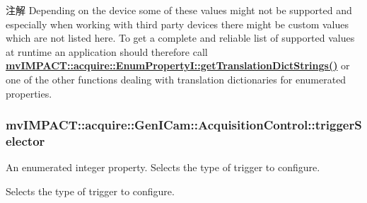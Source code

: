 \begin{DoxyNote}{注解}
Depending on the device some of these values might not be supported and especially when working with third party devices there might be custom values which are not listed here. To get a complete and reliable list of supported values at runtime an application should therefore call {\bfseries \hyperlink{classmv_i_m_p_a_c_t_1_1acquire_1_1_enum_property_i_a0ba6ccbf5ee69784d5d0b537924d26b6}{mv\+I\+M\+P\+A\+C\+T\+::acquire\+::\+Enum\+Property\+I\+::get\+Translation\+Dict\+Strings()}} or one of the other functions dealing with translation dictionaries for enumerated properties. 
\end{DoxyNote}
\hypertarget{classmv_i_m_p_a_c_t_1_1acquire_1_1_gen_i_cam_1_1_acquisition_control_a38e4b4d2d7da4b24d3686be94cc0a886}{
\subsubsection[{trigger\+Selector}]{ mv\+I\+M\+P\+A\+C\+T\+::acquire\+::\+Gen\+I\+Cam\+::\+Acquisition\+Control\+::trigger\+Selector}}\label{classmv_i_m_p_a_c_t_1_1acquire_1_1_gen_i_cam_1_1_acquisition_control_a38e4b4d2d7da4b24d3686be94cc0a886}


An enumerated integer property. Selects the type of trigger to configure. 

Selects the type of trigger to configure.


